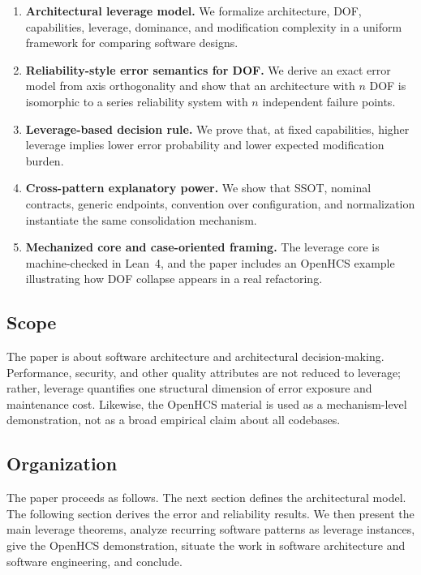 \begin{enumerate}
\item \textbf{Architectural leverage model.} We formalize architecture, DOF, capabilities, leverage, dominance, and modification complexity in a uniform framework for comparing software designs.

\item \textbf{Reliability-style error semantics for DOF.} We derive an exact error model from axis orthogonality and show that an architecture with $n$ DOF is isomorphic to a series reliability system with $n$ independent failure points.

\item \textbf{Leverage-based decision rule.} We prove that, at fixed capabilities, higher leverage implies lower error probability and lower expected modification burden.

\item \textbf{Cross-pattern explanatory power.} We show that SSOT, nominal contracts, generic endpoints, convention over configuration, and normalization instantiate the same consolidation mechanism.

\item \textbf{Mechanized core and case-oriented framing.} The leverage core is machine-checked in Lean~4, and the paper includes an OpenHCS example illustrating how DOF collapse appears in a real refactoring.
\end{enumerate}

\subsection{Scope}

The paper is about software architecture and architectural decision-making. Performance, security, and other quality attributes are not reduced to leverage; rather, leverage quantifies one structural dimension of error exposure and maintenance cost. Likewise, the OpenHCS material is used as a mechanism-level demonstration, not as a broad empirical claim about all codebases.

\subsection{Organization}

The paper proceeds as follows. The next section defines the architectural model. The following section derives the error and reliability results. We then present the main leverage theorems, analyze recurring software patterns as leverage instances, give the OpenHCS demonstration, situate the work in software architecture and software engineering, and conclude.
